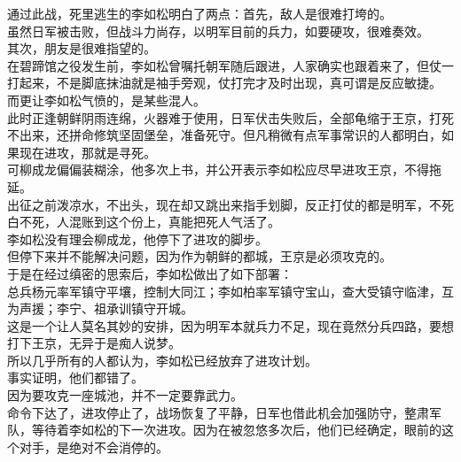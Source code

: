\begin{multicols}{\theparacolNo}
通过此战，死里逃生的李如松明白了两点：首先，敌人是很难打垮的。\\

虽然日军被击败，但战斗力尚存，以明军目前的兵力，如要硬攻，很难奏效。\\

其次，朋友是很难指望的。\\

在碧蹄馆之役发生前，李如松曾嘱托朝军随后跟进，人家确实也跟着来了，但仗一打起来，不是脚底抹油就是袖手旁观，仗打完才及时出现，真可谓是反应敏捷。\\

而更让李如松气愤的，是某些混人。\\

此时正逢朝鲜阴雨连绵，火器难于使用，日军伏击失败后，全部龟缩于王京，打死不出来，还拼命修筑坚固堡垒，准备死守。但凡稍微有点军事常识的人都明白，如果现在进攻，那就是寻死。\\

可柳成龙偏偏装糊涂，他多次上书，并公开表示李如松应尽早进攻王京，不得拖延。\\

出征之前泼凉水，不出头，现在却又跳出来指手划脚，反正打仗的都是明军，不死白不死，人混账到这个份上，真能把死人气活了。\\

李如松没有理会柳成龙，他停下了进攻的脚步。\\

但停下来并不能解决问题，因为作为朝鲜的都城，王京是必须攻克的。\\

于是在经过缜密的思索后，李如松做出了如下部署：\\

总兵杨元率军镇守平壤，控制大同江；李如柏率军镇守宝山，查大受镇守临津，互为声援；李宁、祖承训镇守开城。\\

这是一个让人莫名其妙的安排，因为明军本就兵力不足，现在竟然分兵四路，要想打下王京，无异于是痴人说梦。\\

所以几乎所有的人都认为，李如松已经放弃了进攻计划。\\

事实证明，他们都错了。\\

因为要攻克一座城池，并不一定要靠武力。\\

命令下达了，进攻停止了，战场恢复了平静，日军也借此机会加强防守，整肃军队，等待着李如松的下一次进攻。因为在被忽悠多次后，他们已经确定，眼前的这个对手，是绝对不会消停的。\\


\end{multicols}
